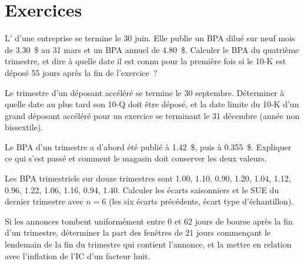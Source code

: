 \section{Exercices}

\begin{exercise}[$\star$]\label{exo:rs:fundamental-analyst-and-event-features:1}
L' d'une entreprise se termine le 30 juin. Elle publie un BPA dilué sur neuf mois de 3.30~\$ au 31 mars et un BPA annuel de 4.80~\$. Calculer le BPA
du quatrième trimestre, et dire à quelle date il est connu pour la première fois si le 10-K est déposé 55 jours après la fin de l'exercice~?
\end{exercise}

\begin{exercise}[$\star$]\label{exo:rs:fundamental-analyst-and-event-features:2}
Le trimestre d'un déposant accéléré se termine le 30 septembre. Déterminer à quelle date au plus tard son 10-Q doit être déposé, et la date limite du 10-K d'un grand déposant accéléré pour un exercice
se terminant le 31 décembre (année non bissextile).
\end{exercise}

\begin{exercise}[$\star$]\label{exo:rs:fundamental-analyst-and-event-features:3}
Le BPA d'un trimestre a d'abord été publié à 1.42~\$, puis à 0.355~\$. Expliquer ce qui s'est passé et comment le magasin doit conserver les deux valeurs.
\end{exercise}

\begin{exercise}[$\star\star$]\label{exo:rs:fundamental-analyst-and-event-features:4}
Les BPA trimestriels sur douze trimestres sont 1.00, 1.10, 0.90, 1.20, 1.04, 1.12, 0.96, 1.22, 1.06, 1.16, 0.94, 1.40. Calculer les écarts saisonniers et le SUE du dernier trimestre avec $n = 6$ (les six écarts précédents, écart type d'échantillon).
\end{exercise}

\begin{exercise}[$\star\star$]\label{exo:rs:fundamental-analyst-and-event-features:5}
Si les annonces tombent uniformément entre 0 et 62 jours de bourse après la fin d'un trimestre, déterminer la part des fenêtres de 21 jours commençant le lendemain de la
fin du trimestre qui contient l'annonce, et la mettre en relation avec l'inflation de l'IC d'un facteur huit.
\end{exercise}

